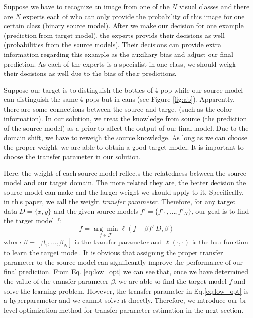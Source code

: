 Suppose we have to recognize an image from one of the $N$ visual classes and there are $N$ experts each of who can only provide the probability of this image for one certain class (binary source model). After we make our decision for one example (prediction from target model), the experts provide their decisions as well (probabilities from the source models). Their decisions can provide extra information regarding this example as the auxiliary bias and adjust our final prediction.
As each of the experts is a specialist in one class, we should weigh their decisions as well due to the bias of their predictions. 

Suppose our target is to distinguish the bottles of 4 pop while our source model can distinguish the same 4 pops but in cans (see Figure \ref{fig:ab}). Apparently, there are some connections between the source and target (such as the color information). In our solution, we treat the knowledge from source (the prediction of the source model) as a prior to affect the output of our final model. Due to the domain shift, we have to reweigh the source knowledge. As long as we can choose the proper weight, we are able to obtain a good target model. It is important to choose the transfer parameter in our solution.  

Here, the weight of each source model reflects the relatedness between the source model and our target domain. The more related they are, the better decision the source model can make and the larger weight we should apply to it. Specifically, in this paper, we call the weight \textit{transfer parameter}. Therefore, for any target data $D=\{x,y\}$ and the given source models $f'=\{f'_1,...,f'_N\}$, our goal is to find the target model $f$:
\begin{equation}\label{eq:low_opt}
f=\underset{f \in \mathcal{F}}{\arg \min}\ell\left(f+\beta f'|D,\beta\right)
\end{equation} 
where $\beta=[\beta_1,...,\beta_N]$ is the transfer parameter and $\ell(\cdot,\cdot)$ is the loss function to learn the target model.
It is obvious that assigning the proper transfer parameter to the source model can significantly improve the performance of our final prediction.
From Eq. \eqref{eq:low_opt} we can see that, once we have determined the value of the transfer parameter $\beta$, we are able to find the target model $f$ and solve the learning problem.
However, the transfer parameter in Eq.\eqref{eq:low_opt} is a hyperparameter and we cannot solve it directly. Therefore, we introduce our bi-level optimization method for transfer parameter estimation in the next section.

